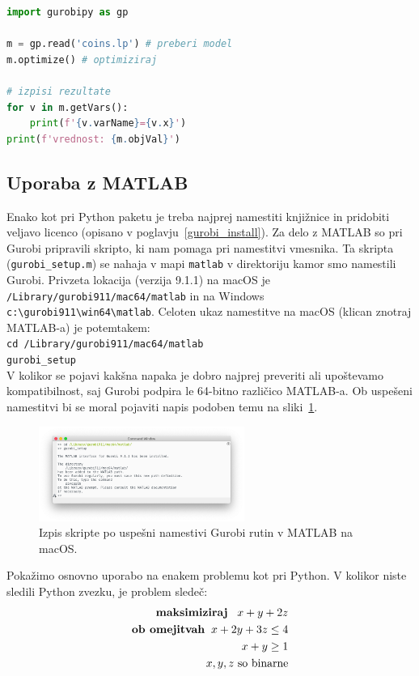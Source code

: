 \documentclass[a4paper,11pt]{article}
\begin{document}
\begin{lstlisting}[language=Python,caption=Primer uporabe LP formatov in gurobipy,label=code:gurobipy]
import gurobipy as gp

m = gp.read('coins.lp') # preberi model
m.optimize() # optimiziraj

# izpisi rezultate
for v in m.getVars(): 
    print(f'{v.varName}={v.x}')
print(f'vrednost: {m.objVal}')
\end{lstlisting}

\subsection{Uporaba z MATLAB}
\label{gurobi_matlab}

Enako kot pri Python paketu je treba najprej namestiti knjižnice in pridobiti veljavo licenco (opisano v poglavju~\ref{gurobi_install}). Za delo z MATLAB so pri Gurobi pripravili skripto, ki nam pomaga pri namestitvi vmesnika. Ta skripta (\texttt{gurobi\_setup.m}) se nahaja v mapi \texttt{matlab} v direktoriju kamor smo namestili Gurobi. Privzeta lokacija (verzija 9.1.1) na macOS je \texttt{/Library/gurobi911/\-mac64/matlab} in na Windows \texttt{c:\textbackslash gurobi911\textbackslash win64\textbackslash matlab}. Celoten ukaz namestitve na macOS (klican znotraj MATLAB-a) je potemtakem: \\
\texttt{cd /Library/gurobi911/mac64/matlab} \\
\texttt{gurobi\_setup} \\
 V kolikor se pojavi kakšna napaka je dobro najprej preveriti ali upoštevamo kompatibilnost, saj Gurobi podpira le 64-bitno različico MATLAB-a. Ob uspešeni namestitvi bi se moral pojaviti napis podoben temu na sliki~\ref{img:gurobi_matlab_install}.
\begin{figure}[hbpt]
	\centering
	\includegraphics[width=0.6\textwidth]{images/gurobi_matlab_install.png}
	\caption{Izpis skripte po uspešni namestivi Gurobi rutin v MATLAB na macOS.}
	\label{img:gurobi_matlab_install}
\end{figure}

Pokažimo osnovno uporabo na enakem problemu kot pri Python. V kolikor niste sledili Python zvezku, je problem sledeč:
\begin{equation}
\begin{aligned}
\textbf{maksimiziraj} \hspace{3mm} x + y + 2z  \\
\textbf{ob omejitvah} \hspace{2mm} x + 2y + 3z \leq 4\\
x + y \geq 1 \\
x, y, z \text{ so binarne}
\end{aligned}
\end{equation}
\end{document}
